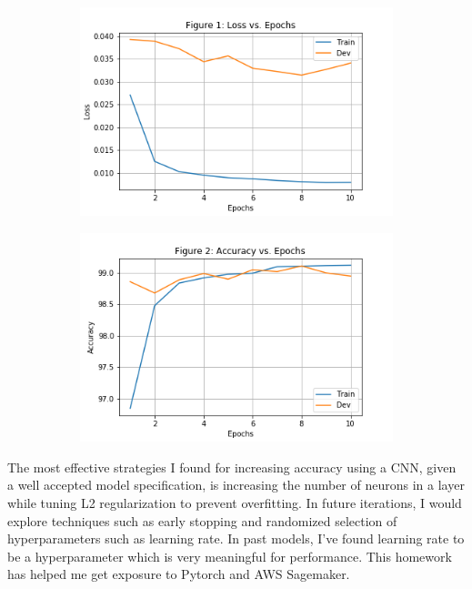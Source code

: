 \documentclass[a4paper,12pt]{article} %
\begin{document}
\begin{figure}[t]
  \caption{CNN with Batch Norm and L2 Regularization=0.002}
  \label{fig:cnnL2}
  \begin{subfigure}{0.45\textwidth}
    \includegraphics[width=\textwidth]{fig3}
  \end{subfigure}
  \begin{subfigure}{0.45\textwidth}
    \includegraphics[width=\textwidth]{fig4}
  \end{subfigure}
\end{figure}

The most effective strategies I found for increasing accuracy using a
CNN, given a well accepted model specification, is increasing the number
of neurons in a layer while tuning L2 regularization to prevent overfitting.
In future iterations, I would explore techniques such as early stopping and
randomized selection of hyperparameters such as learning rate. In past
models, I've found learning rate to be a hyperparameter which is very
meaningful for performance. This homework has helped me get exposure to
Pytorch and AWS Sagemaker.
\end{document}
